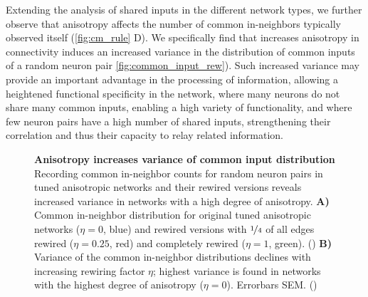 Extending the analysis of shared inputs in the different network
types, we further observe that anisotropy affects the number of common
in-neighbors typically observed itself (\autoref{fig:cm_rule} D). We
specifically find that increases anisotropy in connectivity induces an
increased variance in the distribution of common inputs of a random
neuron pair \autoref{fig:common_input_rew}). Such increased variance
may provide an important advantage in the processing of information,
allowing a heightened functional specificity in the network, where
many neurons do not share many common inputs, enabling a high variety
of functionality, and where few neuron pairs have a high number of
shared inputs, strengthening their correlation and thus their capacity
to relay related information.



\begin{figure}[H]
  \centering
  \captionsetup{skip=7pt}
  \caption{\textbf{Anisotropy increases variance of common input
      distribution} Recording common in-neighbor counts for random
    neuron pairs in tuned anisotropic networks and their rewired
    versions reveals increased variance in networks with a high degree
    of anisotropy. \textbf{A)} Common in-neighbor distribution for
    original tuned anisotropic networks ($\eta = 0$, blue) and rewired
    versions with $\nicefrac{1}{4}$ of all edges rewired ($\eta =
    0.25$, red) and completely rewired ($\eta =1 $, green).
    () \textbf{B)} Variance of the common
    in-neighbor distributions declines with increasing rewiring factor
    $\eta$; highest variance is found in networks with the highest
    degree of anisotropy ($\eta = 0$). Errorbars SEM. ()}
  \label{fig:common_input_rew}
\end{figure}



